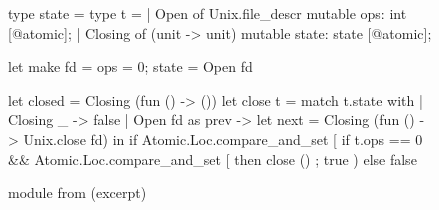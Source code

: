 \begin{figure}[tp]
\begin{ocamlcode}
type state =                             type t =
  | Open of Unix.file_descr                { mutable ops: int [@atomic];
  | Closing of (unit -> unit)                mutable state: state [@atomic]; }            

let make fd = { ops = 0; state = Open fd }

let closed = Closing (fun () -> ())
let close t =
  match t.state with
  | Closing _ -> false
  | Open fd as prev ->
      let next = Closing (fun () -> Unix.close fd) in
      if Atomic.Loc.compare_and_set [%
        if t.ops == 0
        && Atomic.Loc.compare_and_set [%
        then close () ;
        true
      ) else false
\end{ocamlcode}
\caption{ module from \Eio (excerpt)}
\label{fig:rcfd}
\end{figure}

